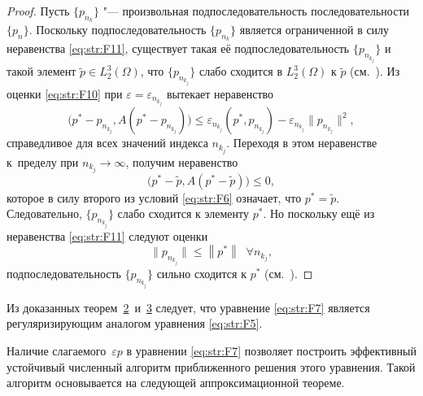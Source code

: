 \begin{proof}
Пусть $\{p_{n_{k} } \}$ "--- произвольная подпоследовательность последовательности $\{p_{n} \}$.
Поскольку подпоследовательность $\{p_{n_{k} } \}$ является ограниченной в силу неравенства \eqref{eq:str:F11}, 
существует такая её подпоследовательность $\{p_{n_{k_{j} } } \}$ и такой элемент $\tilde{p}\in L_{2}^{3} (\Omega)$, 
что $\{p_{n_{k_{j} } } \}$ слабо сходится в $L_{2}^{3} (\Omega)$ к $\tilde{p}$ (см.~\cite[теорема~1.7]{str:bib:AleksNepodTochki}).
Из оценки \eqref{eq:str:F10} при $\varepsilon =\varepsilon _{n_{k_{j} } } $ вытекает неравенство
$$
\bigl(p^{*} -p_{n_{k_{j} } } ,A (p^{*} -p_{n_{k_{j} } } )\bigr)\le 
\varepsilon _{n_{k_{j} } } (p^{*} ,p_{n_{k_{j} } } )-\varepsilon _{n_{k_{j} } } \| p_{n_{k_{j} } } \| ^{2} ,
$$ 
справедливое для всех значений индекса $n_{k_{j} } $.
Переходя в этом неравенстве к~пределу при $n_{k_{j} } \to \infty $, получим неравенство 
$$
\bigl(p^{*} -\tilde{p},A\left(p^{*} -\tilde{p}\right)\bigr)\le 0,
$$ 
которое в силу второго из условий \eqref{eq:str:F6} означает, что $p^{*} =\tilde{p}$.
Следовательно, $\{p_{n_{k_{j} } } \}$ слабо сходится к элементу $p^{*} $.
Но поскольку ещё из неравенства \eqref{eq:str:F11} следуют оценки 
$$
\| p_{n_{k_{j} } } \| \le \left\| p^{*} \right\| \; \; \forall n_{k_{j} } ,
$$
подпоследовательность $\{p_{n_{k_{j} } } \}$ сильно сходится к $p^{*} $  (см.~\cite[теорема~1.4]{str:bib:AleksNepodTochki}). 
\end{proof}

Из доказанных теорем~\hyperlink{str:th2}{2}~и~\hyperlink{str:th3}{3} следует, что уравнение \eqref{eq:str:F7} является регуляризирующим аналогом уравнения \eqref{eq:str:F5}.

\smallskip

Наличие слагаемого~$\varepsilon  p$ в уравнении \eqref{eq:str:F7} позволяет построить эффективный устойчивый численный алгоритм приближенного решения этого уравнения.
Такой алгоритм основывается на следующей аппроксимационной теореме.

\smallskip

\hypertarget{str:th4}{}


